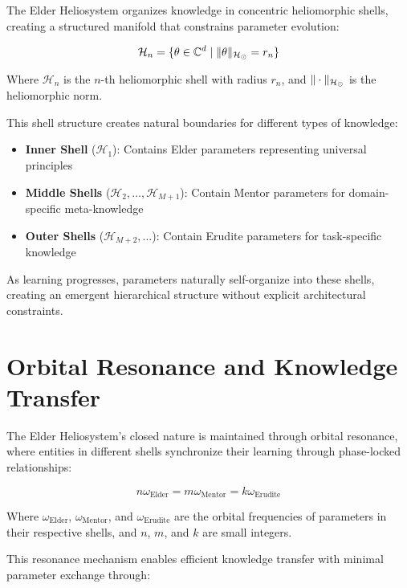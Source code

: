 The Elder Heliosystem organizes knowledge in concentric heliomorphic shells, creating a structured manifold that constrains parameter evolution:

\begin{equation}
\mathcal{H}_n = \{\theta \in \mathbb{C}^{d} \mid \|\theta\|_{\mathcal{H}_{\odot}} = r_n\}
\end{equation}

Where $\mathcal{H}_n$ is the $n$-th heliomorphic shell with radius $r_n$, and $\|\cdot\|_{\mathcal{H}_{\odot}}$ is the heliomorphic norm.

This shell structure creates natural boundaries for different types of knowledge:

\begin{itemize}
    \item \textbf{Inner Shell} ($\mathcal{H}_1$): Contains Elder parameters representing universal principles
    \item \textbf{Middle Shells} ($\mathcal{H}_2, \ldots, \mathcal{H}_{M+1}$): Contain Mentor parameters for domain-specific meta-knowledge
    \item \textbf{Outer Shells} ($\mathcal{H}_{M+2}, \ldots$): Contain Erudite parameters for task-specific knowledge
\end{itemize}

As learning progresses, parameters naturally self-organize into these shells, creating an emergent hierarchical structure without explicit architectural constraints.

\section{Orbital Resonance and Knowledge Transfer}

The Elder Heliosystem's closed nature is maintained through orbital resonance, where entities in different shells synchronize their learning through phase-locked relationships:

\begin{equation}
n\omega_{\text{Elder}} = m\omega_{\text{Mentor}} = k\omega_{\text{Erudite}}
\end{equation}

Where $\omega_{\text{Elder}}$, $\omega_{\text{Mentor}}$, and $\omega_{\text{Erudite}}$ are the orbital frequencies of parameters in their respective shells, and $n$, $m$, and $k$ are small integers.

This resonance mechanism enables efficient knowledge transfer with minimal parameter exchange through:

